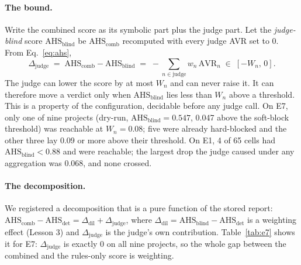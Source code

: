 \documentclass[10pt,a4paper]{article}
\newcommand{\Wn}{W_n}
\newcommand{\ahs}[1]{\mathrm{AHS}_{\mathrm{#1}}}
\begin{document}
\paragraph{The bound.}
Write the combined score as its symbolic part plus the judge part. Let the \emph{judge-blind} score
$\ahs{blind}$ be $\ahs{comb}$ recomputed with every judge AVR set to 0. From Eq.~\eqref{eq:ahs},
\begin{equation}\label{eq:bound}
  \Delta_{\mathrm{judge}} \;=\; \ahs{comb} - \ahs{blind} \;=\; -\sum_{n \in \text{judge}} w_n\, \mathrm{AVR}_n
  \;\in\; [-\Wn,\, 0] .
\end{equation}
The judge can lower the score by at most $\Wn$ and can never raise it. It can therefore move a verdict only when
$\ahs{blind}$ lies less than $\Wn$ above a threshold. This is a property of the configuration, decidable before any
judge call.
On E7, only one of nine projects (dry-run, $\ahs{blind} = 0.547$, 0.047 above the soft-block threshold) was
reachable at $\Wn = 0.08$; five were already hard-blocked and the other three lay 0.09 or more above their
threshold. On E1, 4 of 65 cells had $\ahs{blind} < 0.88$ and were reachable; the largest drop the judge caused
under any aggregation was 0.068, and none crossed.

\paragraph{The decomposition.}
We registered a decomposition that is a pure function of the stored report:
$\ahs{comb} - \ahs{det} = \Delta_{\mathrm{dil}} + \Delta_{\mathrm{judge}}$, where
$\Delta_{\mathrm{dil}} = \ahs{blind} - \ahs{det}$ is a weighting effect (Lesson 3) and $\Delta_{\mathrm{judge}}$ is
the judge's own contribution. Table~\ref{tab:e7} shows it for E7: $\Delta_{\mathrm{judge}}$ is exactly 0 on all
nine projects, so the whole gap between the combined and the rules-only score is weighting.
\end{document}
